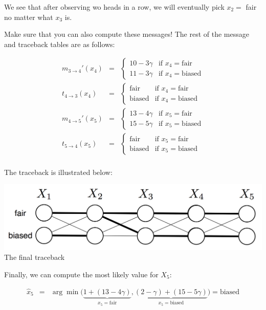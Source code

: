 \documentclass[6008notes.tex]{subfiles}
\begin{document}
We see that after observing wo heads in a row, we will eventually pick $x_2=$ fair no matter what $x_3$ is.

Make sure that you can also compute these messages! The rest of the message and traceback tables are as follows:

\begin{eqnarray*}
m_{3 \rightarrow 4}'(x_4)
&=& \begin{cases}
      10-3\gamma & \text{if }x_4 = \text{fair} \\
      11-3\gamma & \text{if }x_4 = \text{biased}
    \end{cases} \\
t_{4 \rightarrow 3}(x_4)
&=& \begin{cases}
      \text{fair} & \text{if }x_4 = \text{fair} \\
      \text{biased} & \text{if }x_4 = \text{biased}
    \end{cases} \\
m_{4 \rightarrow 5}'(x_5)
&=& \begin{cases}
      13-4\gamma & \text{if }x_5 = \text{fair} \\
      15-5\gamma & \text{if }x_5 = \text{biased}
    \end{cases} \\
t_{5 \rightarrow 4}(x_5)
&=& \begin{cases}
      \text{fair} & \text{if }x_5 = \text{fair} \\
      \text{biased} & \text{if }x_5 = \text{biased}
    \end{cases} \\
\end{eqnarray*}

The traceback is illustrated below:

{\centering\includegraphics[scale=0.3]{images_sec-viterbi-trellis5}\\
The final traceback \par}

Finally, we can compute the most likely value for $X_5$:

\begin{eqnarray*}
\hat{x}_5 &=&
\arg\min \Big( \underbrace{1 + (13 - 4\gamma) }_{x_5 = \text{fair}} , \underbrace{(2-\gamma) + (15-5\gamma)}_{x_5 = \text{biased}} \Big) 
    = \text{biased}
\end{eqnarray*}
\end{document}
